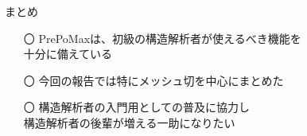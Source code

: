 \begin{frame}{まとめ}
  \begin{itemize}[itemsep=2.5ex, leftmargin=3mm]
      \large
      \item[〇] PrePoMaxは、初級の構造解析者が使えるべき機能を \\
                十分に備えている

      \item[〇] 今回の報告では特にメッシュ切を中心にまとめた

      \item[〇] 構造解析者の入門用としての普及に協力し \\
                構造解析者の後輩が増える一助になりたい

  \end{itemize}
\end{frame}

